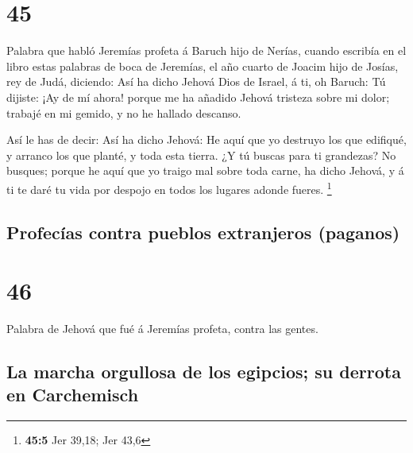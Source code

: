 \hypertarget{section-44}{%
\section{45}\label{section-44}}

 Palabra que habló Jeremías profeta á Baruch hijo de Nerías,
cuando escribía en el libro estas palabras de boca de Jeremías, el año
cuarto de Joacim hijo de Josías, rey de Judá, diciendo:  Así
ha dicho Jehová Dios de Israel, á ti, oh Baruch:  Tú
dijiste: ¡Ay de mí ahora! porque me ha añadido Jehová tristeza sobre mi
dolor; trabajé en mi gemido, y no he hallado descanso.

 Así le has de decir: Así ha dicho Jehová: He aquí que yo
destruyo los que edifiqué, y arranco los que planté, y toda esta tierra.
 ¿Y tú buscas para ti grandezas? No busques; porque he aquí
que yo traigo mal sobre toda carne, ha dicho Jehová, y á ti te daré tu
vida por despojo en todos los lugares adonde fueres. \footnote{\textbf{45:5}
  Jer 39,18; Jer 43,6}

\hypertarget{profecuxedas-contra-pueblos-extranjeros-paganos}{%
\subsection{Profecías contra pueblos extranjeros
(paganos)}\label{profecuxedas-contra-pueblos-extranjeros-paganos}}

\hypertarget{section-45}{%
\section{46}\label{section-45}}

 Palabra de Jehová que fué á Jeremías profeta, contra las
gentes.

\hypertarget{la-marcha-orgullosa-de-los-egipcios-su-derrota-en-carchemisch}{%
\subsection{La marcha orgullosa de los egipcios; su derrota en
Carchemisch}\label{la-marcha-orgullosa-de-los-egipcios-su-derrota-en-carchemisch}}

